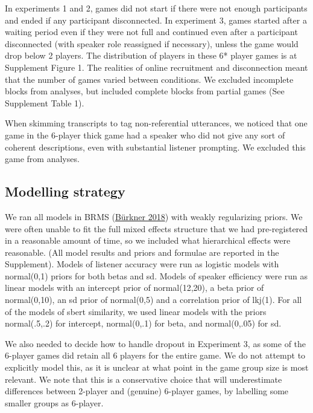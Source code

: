 \documentclass[
  english,
  a4paper,
]{article}
\begin{document}
In experiments 1 and 2, games did not start if there were not enough participants and ended if any participant disconnected. In experiment 3, games started after a waiting period even if they were not full and continued even after a participant disconnected (with speaker role reassigned if necessary), unless the game would drop below 2 players. The distribution of players in these 6* player games is at Supplement Figure 1. The realities of online recruitment and disconnection meant that the number of games varied between conditions. We excluded incomplete blocks from analyses, but included complete blocks from partial games (See Supplement Table 1).

When skimming transcripts to tag non-referential utterances, we noticed that one game in the 6-player thick game had a speaker who did not give any sort of coherent descriptions, even with substantial listener prompting. We excluded this game from analyses.

\hypertarget{modelling-strategy}{%
\subsection{Modelling strategy}\label{modelling-strategy}}

We ran all models in BRMS (\protect\hyperlink{ref-burkner2018}{Bürkner 2018}) with weakly regularizing priors.
We were often unable to fit the full mixed effects structure that we had pre-registered in a reasonable amount of time, so we included what hierarchical effects were reasonable. (All model results and priors and formulae are reported in the Supplement).
Models of listener accuracy were run as logistic models with normal(0,1) priors for both betas and sd.
Models of speaker efficiency were run as linear models with an intercept prior of normal(12,20), a beta prior of normal(0,10), an sd prior of normal(0,5) and a correlation prior of lkj(1).
For all of the models of sbert similarity, we used linear models with the priors normal(.5,.2) for intercept, normal(0,.1) for beta, and normal(0,.05) for sd.

We also needed to decide how to handle dropout in Experiment 3, as some of the 6-player games did retain all 6 players for the entire game.
We do not attempt to explicitly model this, as it is unclear at what point in the game group size is most relevant.
We note that this is a conservative choice that will underestimate differences between 2-player and (genuine) 6-player games, by labelling some smaller groups as 6-player.
\end{document}
